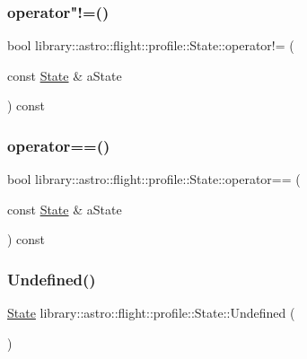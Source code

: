\subsubsection{\texorpdfstring{operator"!=()}{operator!=()}}
{\footnotesize\ttfamily bool library\+::astro\+::flight\+::profile\+::\+State\+::operator!= (\begin{DoxyParamCaption}\item[{const \hyperlink{classlibrary_1_1astro_1_1flight_1_1profile_1_1_state}{State} \&}]{a\+State }\end{DoxyParamCaption}) const}

\mbox{\label{classlibrary_1_1astro_1_1flight_1_1profile_1_1_state_af9508e4482013592c37e57173baea944}} 
\subsubsection{\texorpdfstring{operator==()}{operator==()}}
{\footnotesize\ttfamily bool library\+::astro\+::flight\+::profile\+::\+State\+::operator== (\begin{DoxyParamCaption}\item[{const \hyperlink{classlibrary_1_1astro_1_1flight_1_1profile_1_1_state}{State} \&}]{a\+State }\end{DoxyParamCaption}) const}

\mbox{\label{classlibrary_1_1astro_1_1flight_1_1profile_1_1_state_a1ad05946cb00b3b26fd7b56e8f8bfe94}} 
\subsubsection{\texorpdfstring{Undefined()}{Undefined()}}
{\footnotesize\ttfamily \hyperlink{classlibrary_1_1astro_1_1flight_1_1profile_1_1_state}{State} library\+::astro\+::flight\+::profile\+::\+State\+::\+Undefined (\begin{DoxyParamCaption}{ }\end{DoxyParamCaption})\hspace{0.3cm}{\ttfamily [static]}}




